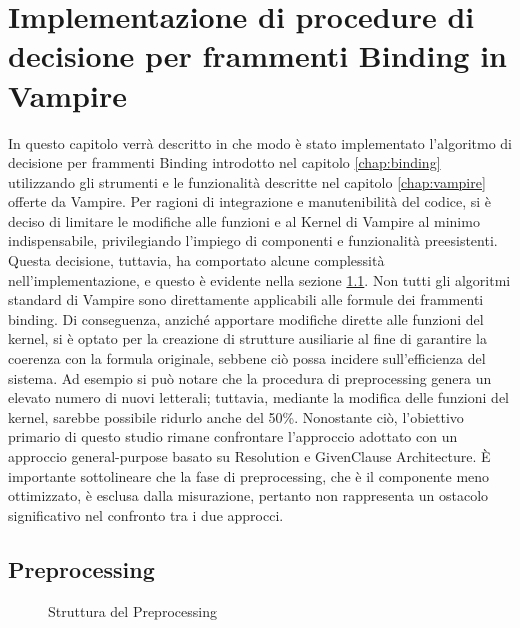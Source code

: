 \documentclass[./main.tex]{subfiles}
\begin{document}
\newcommand{\ob}{\textit{1B} }
\newcommand{\fb}{$\forall$\textit{1B} }
\newcommand{\cb}{\textit{CB} }
\newcommand{\dbb}{\textit{DB} }

\chapter{Implementazione di procedure di decisione per frammenti Binding in Vampire}
In questo capitolo verrà descritto in che modo è stato implementato l'algoritmo di decisione per frammenti Binding 
introdotto nel capitolo \ref{chap:binding} utilizzando gli strumenti 
e le funzionalità descritte nel capitolo \ref{chap:vampire} offerte da Vampire.
Per ragioni di integrazione e manutenibilità del codice,
si è deciso di limitare le modifiche alle funzioni e al Kernel di Vampire al minimo indispensabile, 
privilegiando l'impiego di componenti e funzionalità preesistenti. 
Questa decisione, tuttavia, ha comportato alcune complessità nell'implementazione, 
e questo è evidente nella sezione \ref{sec:preprocessing}. 
Non tutti gli algoritmi standard di Vampire sono direttamente applicabili alle formule dei frammenti binding. 
Di conseguenza, anziché apportare modifiche dirette alle funzioni del kernel, 
si è optato per la creazione di strutture ausiliarie al fine di garantire la coerenza con la formula originale,
sebbene ciò possa incidere sull'efficienza del sistema. 
Ad esempio si può notare che la procedura di preprocessing genera un elevato numero di nuovi letterali; 
tuttavia, mediante la modifica delle funzioni del kernel, sarebbe possibile ridurlo anche del 50\%.
Nonostante ciò, l'obiettivo primario di questo studio rimane confrontare l'approccio adottato con un approccio
general-purpose basato su Resolution e GivenClause Architecture. 
È importante sottolineare che la fase di preprocessing, che è il componente meno ottimizzato,
è esclusa dalla misurazione, 
pertanto non rappresenta un ostacolo significativo nel confronto tra i due approcci.



\section{Preprocessing} \label{sec:preprocessing}

\begin{figure}[H]
    \centering
    \scalebox{0.55}{
        
    }
    \caption{Struttura del Preprocessing}
    \label{fig:preprocessing}
\end{figure}
\end{document}
